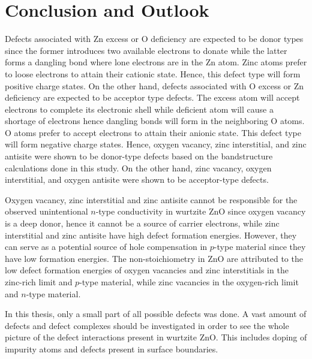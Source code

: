 \chapter{Conclusion and Outlook} \label{chap:conclu}
\vspace{-1em}
Defects associated with Zn excess or O deficiency are expected to be donor types since the former introduces two available electrons to donate while the latter forms a dangling bond where lone electrons are in the Zn atom. Zinc atoms prefer to loose electrons to attain their cationic state. Hence, this defect type will form  positive charge states. On the other hand, defects associated with O excess or Zn deficiency are expected to be acceptor type defects. The excess  atom will accept electrons to complete its electronic shell while deficient  atom will cause a shortage of electrons hence  dangling bonds will form in the neighboring O atoms. O atoms prefer to accept electrons to attain their anionic state.
This defect type will form  negative charge states. Hence, oxygen vacancy, zinc interstitial, and zinc antisite were shown to be donor-type defects based on the bandstructure calculations done in this study. On the other hand, zinc vacancy, oxygen interstitial, and oxygen antisite were shown to be acceptor-type defects.

Oxygen vacancy,  zinc interstitial and zinc antisite cannot be responsible for the observed unintentional $n$-type conductivity in wurtzite ZnO since oxygen vacancy is a deep donor, hence it cannot be a source of carrier electrons, while  zinc interstitial and zinc antisite have high defect formation energies. However, they can serve as a potential source of hole compensation in  $p$-type material since they have low formation energies. The non-stoichiometry in ZnO are attributed to the low defect formation energies of oxygen vacancies and  zinc interstitials in the zinc-rich limit and $p$-type material, while zinc vacancies in the oxygen-rich limit and $n$-type material.

In this thesis, only a small part of all possible defects was done.  A vast amount of defects and defect complexes should be investigated in order to see the whole picture of the defect interactions present in wurtzite ZnO. This includes doping of impurity atoms and defects present in surface boundaries. 


